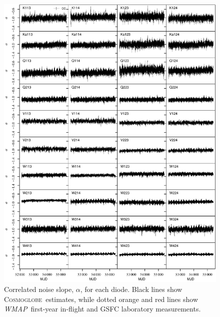 \documentclass[twocolumn]{../../common/aa}
\def\WMAP{\emph{WMAP}}
\newcommand{\cosmoglobe}{\textsc{Cosmoglobe}}
\begin{document}
\begin{figure}[p]
	\centering
	\includegraphics[width=\textwidth]{figures/instpar_CG_alpha_v1.pdf}
	\caption{Correlated noise slope, $\alpha$, for each diode. Black lines show \cosmoglobe\ estimates, while dotted orange and red lines show \WMAP\ first-year in-flight and GSFC laboratory measurements.}        
	\label{fig:alpha}
\end{figure}
\end{document}
